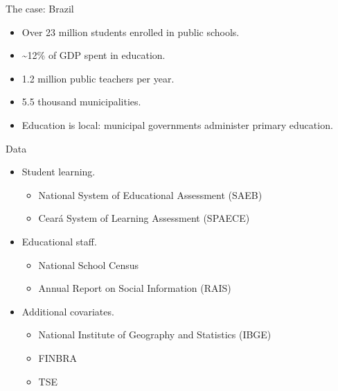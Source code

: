 \documentclass[
  ignorenonframetext,
]{beamer}
\providecommand{\tightlist}{%
  \setlength{\itemsep}{0pt}\setlength{\parskip}{0pt}}
\begin{document}
\begin{frame}{The case: Brazil}
\protect\hypertarget{the-case-brazil}{}

\begin{itemize}
\tightlist
\item
  Over 23 million students enrolled in public schools.
\item
  \textasciitilde12\% of GDP spent in education.
\item
  1.2 million public teachers per year.
\item
  5.5 thousand municipalities.
\item
  Education is local: municipal governments administer primary
  education.
\end{itemize}

\end{frame}

\begin{frame}{Data}
\protect\hypertarget{data}{}

\begin{itemize}
\tightlist
\item
  Student learning.

  \begin{itemize}
  \tightlist
  \item
    National System of Educational Assessment (SAEB)
  \item
    Ceará System of Learning Assessment (SPAECE)
  \end{itemize}
\item
  Educational staff.

  \begin{itemize}
  \tightlist
  \item
    National School Census
  \item
    Annual Report on Social Information (RAIS)
  \end{itemize}
\item
  Additional covariates.

  \begin{itemize}
  \tightlist
  \item
    National Institute of Geography and Statistics (IBGE)
  \item
    FINBRA
  \item
    TSE
  \end{itemize}
\end{itemize}

\end{frame}
\end{document}
